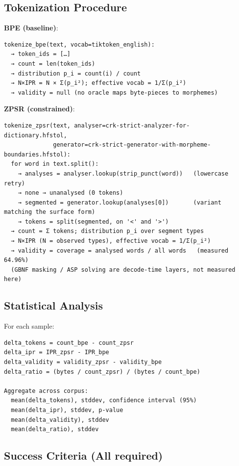\documentclass[11pt,oneside]{article}
\begin{document}
\subsection{Tokenization Procedure}

\textbf{BPE (baseline)}:
\begin{lstlisting}
tokenize_bpe(text, vocab=tiktoken_english):
  → token_ids = […]
  → count = len(token_ids)
  → distribution p_i = count(i) / count
  → N×IPR = N × Σ(p_i²); effective vocab = 1/Σ(p_i²)
  → validity = null (no oracle maps byte-pieces to morphemes)
\end{lstlisting}

\textbf{ZPSR (constrained)}:
\begin{lstlisting}
tokenize_zpsr(text, analyser=crk-strict-analyzer-for-dictionary.hfstol,
              generator=crk-strict-generator-with-morpheme-boundaries.hfstol):
  for word in text.split():
    → analyses = analyser.lookup(strip_punct(word))   (lowercase retry)
    → none → unanalysed (0 tokens)
    → segmented = generator.lookup(analyses[0])       (variant matching the surface form)
    → tokens = split(segmented, on '<' and '>')
  → count = Σ tokens; distribution p_i over segment types
  → N×IPR (N = observed types), effective vocab = 1/Σ(p_i²)
  → validity = coverage = analysed words / all words   (measured 64.96%)
  (GBNF masking / ASP solving are decode-time layers, not measured here)
\end{lstlisting}

\subsection{Statistical Analysis}

For each sample:
\begin{lstlisting}
delta_tokens = count_bpe - count_zpsr
delta_ipr = IPR_zpsr - IPR_bpe
delta_validity = validity_zpsr - validity_bpe
delta_ratio = (bytes / count_zpsr) / (bytes / count_bpe)

Aggregate across corpus:
  mean(delta_tokens), stddev, confidence interval (95%)
  mean(delta_ipr), stddev, p-value
  mean(delta_validity), stddev
  mean(delta_ratio), stddev
\end{lstlisting}

\subsection{Success Criteria (All required)}
\end{document}
